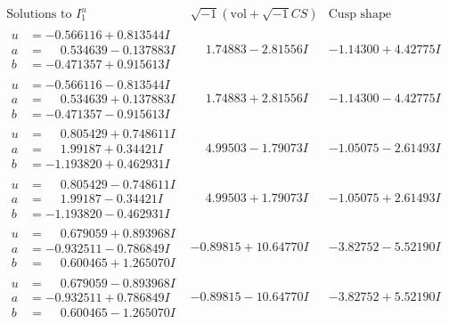 \documentclass[1p]{elsarticle_modified}
\theoremstyle{definition}
\newcommand{\I}{\sqrt{-1}}
\begin{document}
$$\begin{array}{c|c|c}  
\text{Solutions to }I^u_{1}& \I (\text{vol} + \sqrt{-1}CS) & \text{Cusp shape}\\
 \hline 
\begin{aligned}
u &= -0.566116 + 0.813544 I \\
a &= \phantom{-}0.534639 - 0.137883 I \\
b &= -0.471357 + 0.915613 I\end{aligned}
 & \phantom{-}1.74883 - 2.81556 I & -1.14300 + 4.42775 I \\ \hline\begin{aligned}
u &= -0.566116 - 0.813544 I \\
a &= \phantom{-}0.534639 + 0.137883 I \\
b &= -0.471357 - 0.915613 I\end{aligned}
 & \phantom{-}1.74883 + 2.81556 I & -1.14300 - 4.42775 I \\ \hline\begin{aligned}
u &= \phantom{-}0.805429 + 0.748611 I \\
a &= \phantom{-}1.99187 + 0.34421 I \\
b &= -1.193820 + 0.462931 I\end{aligned}
 & \phantom{-}4.99503 - 1.79073 I & -1.05075 - 2.61493 I \\ \hline\begin{aligned}
u &= \phantom{-}0.805429 - 0.748611 I \\
a &= \phantom{-}1.99187 - 0.34421 I \\
b &= -1.193820 - 0.462931 I\end{aligned}
 & \phantom{-}4.99503 + 1.79073 I & -1.05075 + 2.61493 I \\ \hline\begin{aligned}
u &= \phantom{-}0.679059 + 0.893968 I \\
a &= -0.932511 - 0.786849 I \\
b &= \phantom{-}0.600465 + 1.265070 I\end{aligned}
 & -0.89815 + 10.64770 I & -3.82752 - 5.52190 I \\ \hline\begin{aligned}
u &= \phantom{-}0.679059 - 0.893968 I \\
a &= -0.932511 + 0.786849 I \\
b &= \phantom{-}0.600465 - 1.265070 I\end{aligned}
 & -0.89815 - 10.64770 I & -3.82752 + 5.52190 I \\ \hline\begin{aligned}

\end{aligned}
\end{array}$$
\end{document}
